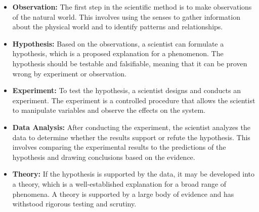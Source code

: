 \begin{itemize}
    \item \textbf{Observation:} The first step in the scientific method is to make observations of the natural world. This involves using the senses to gather information about the physical world and to identify patterns and relationships.
    \item \textbf{Hypothesis:} Based on the observations, a scientist can formulate a hypothesis, which is a proposed explanation for a phenomenon. The hypothesis should be testable and falsifiable, meaning that it can be proven wrong by experiment or observation.
    \item \textbf{Experiment:} To test the hypothesis, a scientist designs and conducts an experiment. The experiment is a controlled procedure that allows the scientist to manipulate variables and observe the effects on the system.
    \item \textbf{Data Analysis:} After conducting the experiment, the scientist analyzes the data to determine whether the results support or refute the hypothesis. This involves comparing the experimental results to the predictions of the hypothesis and drawing conclusions based on the evidence.
    \item \textbf{Theory:} If the hypothesis is supported by the data, it may be developed into a theory, which is a well-established explanation for a broad range of phenomena. A theory is supported by a large body of evidence and has withstood rigorous testing and scrutiny.
\end{itemize}
